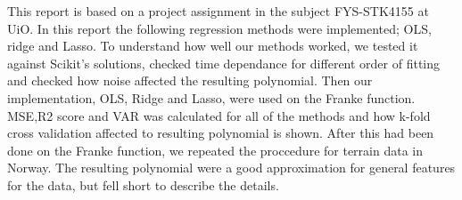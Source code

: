 This report is based on a project assignment in the subject FYS-STK4155 at UiO.\cite{project1}
In this report the following regression methods were implemented; OLS, ridge and Lasso.
To understand how well our methods worked, we tested it against Scikit's solutions,
checked time dependance for different order of fitting and checked how noise affected the
resulting polynomial. Then our implementation, OLS, Ridge and Lasso, were used on the Franke function.
MSE,R2 score and VAR was calculated for all of the methods and how k-fold cross validation
affected to resulting polynomial is shown. After this had been done on the Franke function,
we repeated the proccedure for terrain data in Norway. The resulting polynomial were a good
approximation for general features for the data, but fell short to describe the details.
